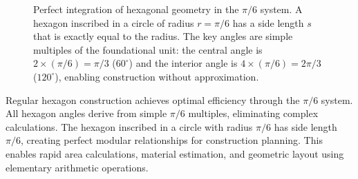 \documentclass[11pt]{article}
\begin{document}
\begin{figure}[h!]
\centering
{}
\caption{Perfect integration of hexagonal geometry in the $\pi/6$ system. A hexagon inscribed in a circle of radius $r = \pi/6$ has a side length $s$ that is exactly equal to the radius. The key angles are simple multiples of the foundational unit: the central angle is $2 \times (\pi/6) = \pi/3$ ($60^\circ$) and the interior angle is $4 \times (\pi/6) = 2\pi/3$ ($120^\circ$), enabling construction without approximation.}
\label{fig:hexagon_geometry}
\end{figure}

Regular hexagon construction achieves optimal efficiency through the $\pi/6$ system. All hexagon angles derive from simple $\pi/6$ multiples, eliminating complex calculations. The hexagon inscribed in a circle with radius $\pi/6$ has side length $\pi/6$, creating perfect modular relationships for construction planning. This enables rapid area calculations, material estimation, and geometric layout using elementary arithmetic operations.
\end{document}
